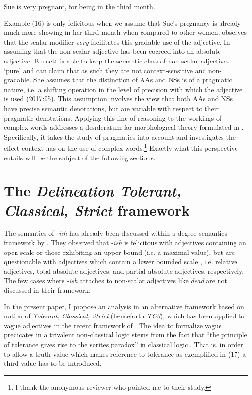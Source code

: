 \documentclass[output=paper
,modfonts
,nonflat]{langsci/langscibook}
\begin{document}
\begin{examples}
	\item Sue is very pregnant, for being in the third month.
\end{examples}

Example (16) is only felicitous when we assume that Sue's pregnancy is already much more showing in her third month when compared to other women. \textcite[44]{Burnett2017} observes that the scalar modifier \textit{very} facilitates this gradable use of the adjective. In assuming that the non-scalar adjective has been coerced into an absolute adjective, Burnett is able to keep the semantic class of non-scalar adjectives `pure' and can claim that as such they are not context-sensitive and non-gradable. She assumes that the distinction of AAs and NSs is of a pragmatic nature, i.e. a shifting operation in the level of precision with which the adjective is used (2017:95). This assumption involves the view that both AAs and NSs have precise semantic denotations, but are variable with respect to their pragmatic denotations. Applying this line of reasoning to the workings of complex words addresses a desideratum for morphological theory formulated in \textcite[226]{Plag1999}. Specifically, it takes the study of pragmatics into account and investigates the effect context has on the use of complex words.\footnote{I thank the anonymous reviewer who pointed me to their study.} Exactly what this perspective entails will be the subject of the following sections.

\section{The \textit{Delineation Tolerant, Classical, Strict} framework}
\label{sec:deltcs} %

The semantics of \textit{-ish} has already been discussed within a degree semantics framework by \citet*{Bochnak2014}. They observed that \textit{-ish} is felicitous with adjectives containing an open scale or those exhibiting an upper bound (i.e. a maximal value), but are questionable with adjectives which contain a lower bounded scale \textcite[435--436]{Bochnak2014}, i.e. relative adjectives, total absolute adjectives, and partial absolute adjectives, respectively. The few cases where \textit{-ish} attaches to non-scalar adjectives like \textit{dead} are not discussed in their framework.

In the present paper, I propose an analysis in an alternative framework based on \citet*{Cobreros2012} notion of \textit{Tolerant, Classical, Strict} (henceforth \textit{TCS}), which has been applied to vague adjectives in the recent framework of \citet{Burnett2017}. The idea to formalize vague predicates in a trivalent non-classical logic stems from the fact that ``the principle of tolerance gives rise to the sorites paradox'' in classical logic \textcite[348]{Cobreros2012}. That is, in order to allow a truth value which makes reference to tolerance as exemplified in (17) a third value has to be introduced. %
\end{document}
